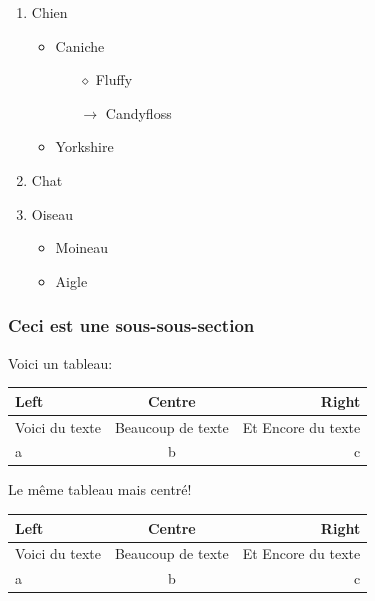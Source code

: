 \documentclass[paper=a4, fontsize=11pt]{article}
\begin{document}
\begin{enumerate}
\item Chien
  \begin{itemize}
    \item Caniche
      \begin{itemize}
        \item[$\diamond$] Fluffy
        \item[$\rightarrow$] Candyfloss
        \end{itemize}
    \item Yorkshire
    \end{itemize}
\item Chat
\item Oiseau
  \begin{itemize}
    \item Moineau
    \item Aigle
    \end{itemize}
\end{enumerate}

\subsubsection{Ceci est une sous-sous-section}

Voici un tableau:\\ %

\begin{tabular}{lcr} %
\toprule
Left & Centre & Right \\
\midrule
Voici du texte & Beaucoup de texte & Et Encore du texte \\
a & b & c \\
\bottomrule
\end{tabular}

\vspace{0.5cm} %

Le même tableau mais centré!

\begin{center}
\begin{tabular}{lcr} %
\toprule
Left & Centre & Right \\
\midrule
Voici du texte & Beaucoup de texte & Et Encore du texte \\
a & b & c \\
\bottomrule
\end{tabular}
\end{center}
\end{document}
